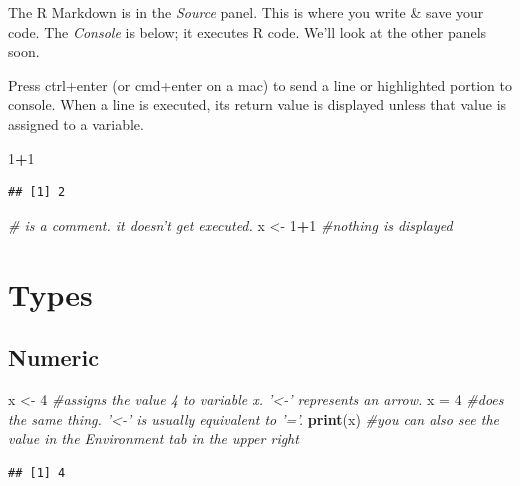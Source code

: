 \documentclass[]{article}
\newenvironment{Shaded}{\begin{snugshade}}{\end{snugshade}}
\newcommand{\KeywordTok}[1]{\textcolor[rgb]{0.13,0.29,0.53}{\textbf{#1}}}
\newcommand{\DecValTok}[1]{\textcolor[rgb]{0.00,0.00,0.81}{#1}}
\newcommand{\StringTok}[1]{\textcolor[rgb]{0.31,0.60,0.02}{#1}}
\newcommand{\CommentTok}[1]{\textcolor[rgb]{0.56,0.35,0.01}{\textit{#1}}}
\newcommand{\OperatorTok}[1]{\textcolor[rgb]{0.81,0.36,0.00}{\textbf{#1}}}
\newcommand{\NormalTok}[1]{#1}
\begin{document}
The R Markdown is in the \emph{Source} panel. This is where you write \&
save your code. The \emph{Console} is below; it executes R code. We'll
look at the other panels soon.

Press ctrl+enter (or cmd+enter on a mac) to send a line or highlighted
portion to console. When a line is executed, its return value is
displayed unless that value is assigned to a variable.

\begin{Shaded}
\begin{Highlighting}[]
\DecValTok{1}\OperatorTok{+}\DecValTok{1}
\end{Highlighting}
\end{Shaded}

\begin{verbatim}
## [1] 2
\end{verbatim}

\begin{Shaded}
\begin{Highlighting}[]
\CommentTok{# is a comment. it doesn't get executed.}
\NormalTok{x <-}\StringTok{ }\DecValTok{1}\OperatorTok{+}\DecValTok{1} \CommentTok{#nothing is displayed}
\end{Highlighting}
\end{Shaded}

\section{Types}\label{types}

\subsection{Numeric}\label{numeric}

\begin{Shaded}
\begin{Highlighting}[]
\NormalTok{x <-}\StringTok{ }\DecValTok{4} \CommentTok{#assigns the value 4 to variable x. '<-' represents an arrow.}
\NormalTok{x =}\StringTok{ }\DecValTok{4} \CommentTok{#does the same thing.  '<-' is usually equivalent to '='.}
\KeywordTok{print}\NormalTok{(x) }\CommentTok{#you can also see the value in the Environment tab in the upper right}
\end{Highlighting}
\end{Shaded}

\begin{verbatim}
## [1] 4
\end{verbatim}
\end{document}
